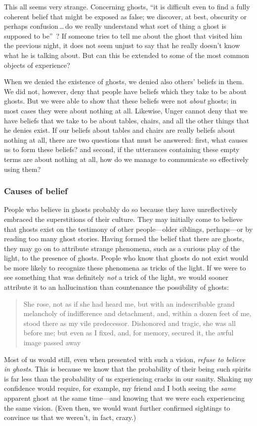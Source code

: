 \documentclass[11pt]{article}
\newenvironment{squote}{\begin{quote}\begin{singlespace}}{\end{singlespace}\end{quote}}
\begin{document}
\begin{spacing}{1.5}
This all seems very strange. Concerning ghosts, ``it is difficult even to find a fully coherent belief that might be exposed as false; we discover, at best, obscurity or perhaps confusion\,\ldots\,do we really understand what sort of thing a ghost is supposed to be''~\citep[76]{stroud2000a}? If someone tries to tell me about the ghost that visited him the previous night, it does not seem unjust to say that he really doesn't know what he is talking about. But can this be extended to some of the most common objects of experience?

When we denied the existence of ghosts, we denied also others' beliefs in them. We did not, however, deny that people have beliefs which they take to be about ghosts. But we were able to show that these beliefs were not {\em about} ghosts; in most cases they were about nothing at all. Likewise, Unger cannot deny that we have beliefs that we take to be about tables, chairs, and all the other things that he denies exist. If our beliefs about tables and chairs are really beliefs about nothing at all, there are two questions that must be answered: first, what causes us to form these beliefs? and second, if the utterances containing these empty terms are about nothing at all, how do we manage to communicate so effectively using them?

\subsubsection{Causes of belief}
\label{unger-cause}
People who believe in ghosts probably do so because they have unreflectively embraced the superstitions of their culture. They may initially come to believe that ghosts exist on the testimony of other people---older siblings, perhaps---or by reading too many ghost stories. Having formed the belief that there are ghosts, they may go on to attribute strange phenomena, such as a curious play of the light, to the presence of ghosts. People who know that ghosts do not exist would be more likely to recognize these phenomena as tricks of the light. If we were to see something that was definitely {\em not} a trick of the light, we would sooner attribute it to an hallucination than countenance the possibility of ghosts:
%
\begin{squote}
She rose, not as if she had heard me, but with an indescribable grand melancholy of indifference and detachment, and, within a dozen feet of me, stood there as my vile predecessor. Dishonored and tragic, she was all before me; but even as I fixed, and, for memory, secured it, the awful image passed away~\citep[58]{james1991}
\end{squote}
%
Most of us would still, even when presented with such a vision, {\em refuse to believe in ghosts}. This is because we know that the probability of their being such spirits is far less than the probability of us experiencing cracks in our sanity. Shaking my confidence would require, for example, my friend and I both seeing the {\em same} apparent ghost at the same time---and knowing that we were each experiencing the same vision. (Even then, we would want further confirmed sightings to convince us that we weren't, in fact, crazy.)


\end{spacing}
\end{document}
